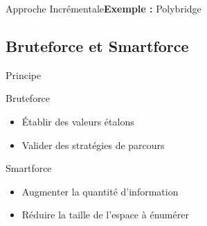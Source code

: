 	\begin{frame}{Approche Incrémentale}{\textbf{Exemple :} Polybridge}
		\begin{figure}
		\end{figure}
	\end{frame}

	\subsection{Bruteforce et Smartforce}
	\begin{frame}{Principe}
		\begin{Bblock}{Bruteforce}
		\begin{itemize}
			\item Établir des valeurs étalons
			\item Valider des stratégies de parcours
		\end{itemize}
		\end{Bblock}
		\begin{Vblock}{Smartforce}
			\begin{itemize}
				\item Augmenter la quantité d'information
				\item Réduire la taille de l'espace à énumérer
			\end{itemize}
		\end{Vblock}
	\end{frame}
	
